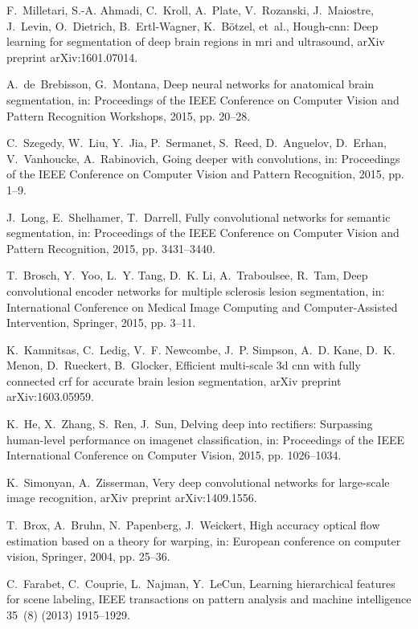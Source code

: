 \documentclass[twoside,fleqn,espcrc2]{elsarticle}
\begin{document}
\begin{thebibliography}{10}
F.~Milletari, S.-A. Ahmadi, C.~Kroll, A.~Plate, V.~Rozanski, J.~Maiostre,
  J.~Levin, O.~Dietrich, B.~Ertl-Wagner, K.~B{\"o}tzel, et~al., Hough-cnn: Deep
  learning for segmentation of deep brain regions in mri and ultrasound, arXiv
  preprint arXiv:1601.07014.

A.~de~Brebisson, G.~Montana, Deep neural networks for anatomical brain
  segmentation, in: Proceedings of the IEEE Conference on Computer Vision and
  Pattern Recognition Workshops, 2015, pp. 20--28.

C.~Szegedy, W.~Liu, Y.~Jia, P.~Sermanet, S.~Reed, D.~Anguelov, D.~Erhan,
  V.~Vanhoucke, A.~Rabinovich, Going deeper with convolutions, in: Proceedings
  of the IEEE Conference on Computer Vision and Pattern Recognition, 2015, pp.
  1--9.

J.~Long, E.~Shelhamer, T.~Darrell, Fully convolutional networks for semantic
  segmentation, in: Proceedings of the IEEE Conference on Computer Vision and
  Pattern Recognition, 2015, pp. 3431--3440.

T.~Brosch, Y.~Yoo, L.~Y. Tang, D.~K. Li, A.~Traboulsee, R.~Tam, Deep
  convolutional encoder networks for multiple sclerosis lesion segmentation,
  in: International Conference on Medical Image Computing and Computer-Assisted
  Intervention, Springer, 2015, pp. 3--11.

K.~Kamnitsas, C.~Ledig, V.~F. Newcombe, J.~P. Simpson, A.~D. Kane, D.~K. Menon,
  D.~Rueckert, B.~Glocker, Efficient multi-scale 3d cnn with fully connected
  crf for accurate brain lesion segmentation, arXiv preprint arXiv:1603.05959.

K.~He, X.~Zhang, S.~Ren, J.~Sun, Delving deep into rectifiers: Surpassing
  human-level performance on imagenet classification, in: Proceedings of the
  IEEE International Conference on Computer Vision, 2015, pp. 1026--1034.

K.~Simonyan, A.~Zisserman, Very deep convolutional networks for large-scale
  image recognition, arXiv preprint arXiv:1409.1556.

T.~Brox, A.~Bruhn, N.~Papenberg, J.~Weickert, High accuracy optical flow
  estimation based on a theory for warping, in: European conference on computer
  vision, Springer, 2004, pp. 25--36.

C.~Farabet, C.~Couprie, L.~Najman, Y.~LeCun, Learning hierarchical features for
  scene labeling, IEEE transactions on pattern analysis and machine
  intelligence 35~(8) (2013) 1915--1929.


\end{thebibliography}
\end{document}
